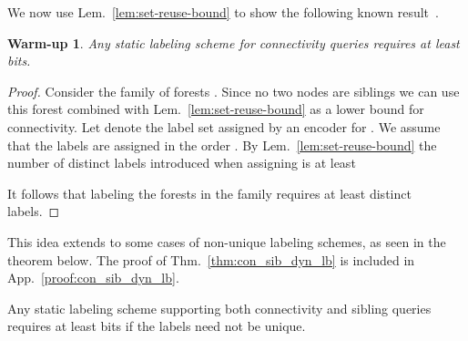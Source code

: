 \documentclass{llncs}
\newtheorem*{warmup}{Warm-up}
\begin{document}
We now use Lem.~\ref{lem:set-reuse-bound} to show the following
known result~\cite{Alstrup05}.

\begin{warmup}
    Any static labeling scheme for connectivity queries requires at least  bits.
\end{warmup}
\begin{proof}
    Consider the family of  forests . Since no two nodes are siblings we can use this forest
    combined with Lem.~\ref{lem:set-reuse-bound} as a lower bound for
    connectivity. Let  denote the label set assigned by an encoder for
    . We assume that the labels are assigned in the order
    . By Lem.~\ref{lem:set-reuse-bound} the number of
    distinct labels introduced when assigning  is at least
    
    It follows that labeling the  forests in the family requires at
    least  distinct labels.
\end{proof}


This idea extends to some cases of non-unique labeling schemes, as seen in
the theorem below. The proof  of Thm.~\ref{thm:con_sib_dyn_lb} is included in App.~\ref{proof:con_sib_dyn_lb}.

\begin{theorem}\label{thm:con_sib_dyn_lb}
    Any static labeling scheme supporting both connectivity and sibling queries
    requires at least  bits if the labels need not
    be unique.
\end{theorem}
\end{document}
